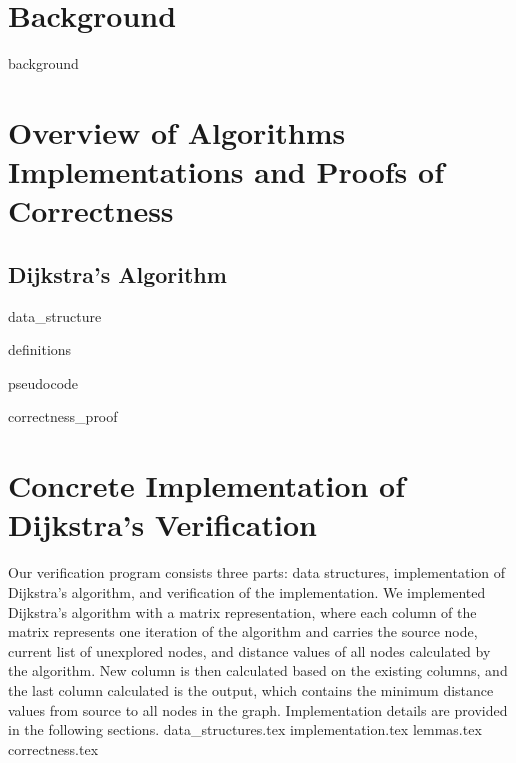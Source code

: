 \documentclass[11pt, a4paper]{article} %
\theoremstyle{definition}
\begin{document}
\section{Background}
{background}

\section{Overview of Algorithms Implementations and Proofs of Correctness}
\subsection{Dijkstra's Algorithm}
{data_structure}

{definitions}

{pseudocode}

{correctness_proof}


\section{Concrete Implementation of Dijkstra's Verification}
Our verification program consists three parts: data structures, implementation of Dijkstra's algorithm, and verification of the implementation. We implemented Dijkstra's algorithm with a matrix representation, where each column of the matrix represents one iteration of the algorithm and carries the source node, current list of unexplored nodes, and distance values of all nodes calculated by the algorithm. New column is then calculated based on the existing columns, and the last column calculated is the output, which contains the minimum distance values from source to all nodes in the graph. Implementation details are provided in the following sections. 
{data_structures.tex}
{implementation.tex}
{lemmas.tex}
{correctness.tex}


\end{document}
